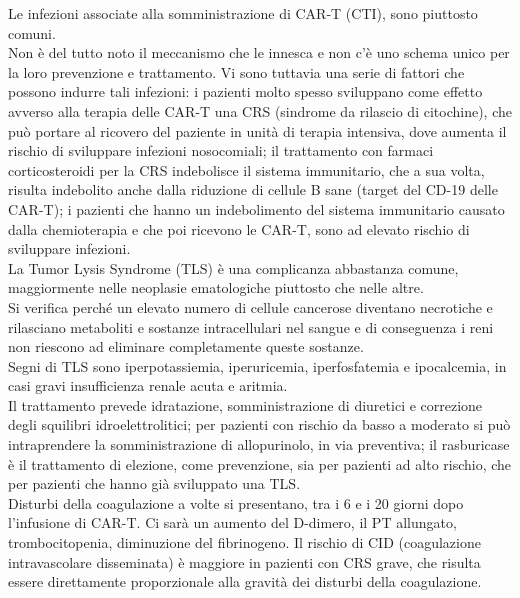 Le infezioni associate alla somministrazione di CAR-T (CTI), sono piuttosto comuni.\\ Non è del tutto noto il meccanismo 
che le innesca e non c’è uno schema unico per la loro prevenzione e trattamento. Vi sono tuttavia una serie di fattori 
che possono indurre tali infezioni: i pazienti molto spesso sviluppano come effetto avverso alla terapia delle CAR-T 
una CRS (sindrome da rilascio di citochine), che può portare al ricovero del paziente in unità di terapia intensiva, 
dove aumenta il rischio di sviluppare infezioni nosocomiali; il trattamento con farmaci corticosteroidi per la CRS 
indebolisce il sistema immunitario, che a sua volta, risulta indebolito anche dalla riduzione di cellule B sane 
(target del CD-19 delle CAR-T); 
i pazienti che hanno un indebolimento del sistema immunitario causato dalla chemioterapia e che poi ricevono le CAR-T, 
sono ad elevato rischio di sviluppare infezioni\cite{Frontiers}.\\

La Tumor Lysis Syndrome (TLS) è una complicanza abbastanza comune, maggiormente nelle neoplasie ematologiche piuttosto 
che nelle altre.\\ 
Si verifica perché un elevato numero di cellule cancerose diventano necrotiche e rilasciano metaboliti e
sostanze intracellulari nel sangue e di conseguenza i reni non riescono ad eliminare completamente queste sostanze.\\ 
Segni di TLS sono iperpotassiemia, iperuricemia, iperfosfatemia e ipocalcemia, in casi gravi insufficienza renale 
acuta e aritmia\cite{Frontiers}.\\ 
Il trattamento prevede idratazione, somministrazione di diuretici e 
correzione degli squilibri idroelettrolitici; per pazienti con rischio da basso a moderato si può intraprendere la 
somministrazione di allopurinolo, in via preventiva; il rasburicase è il trattamento di elezione, come prevenzione,
sia per pazienti ad alto rischio, che per pazienti che hanno già sviluppato una TLS\cite{Frontiers}.\\

Disturbi della coagulazione a volte si presentano, tra i 6 e i 20 giorni dopo l’infusione di CAR-T. Ci sarà un  
aumento del D-dimero, il PT allungato, trombocitopenia, diminuzione del fibrinogeno. Il rischio di CID 
(coagulazione intravascolare disseminata) è maggiore in pazienti con CRS grave, 
che risulta essere direttamente proporzionale alla gravità dei disturbi della coagulazione\cite{Frontiers}.\\


